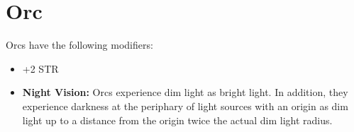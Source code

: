 \section{Orc}\label{orc}

Orcs have the following modifiers:
\begin{itemize}
    \item +2 STR
    \item \textbf{Night Vision:} Orcs experience dim light as bright light. In
        addition, they experience darkness at the periphary of light sources
        with an origin as dim light up to a distance from the origin twice the
        actual dim light radius.
\end{itemize}
